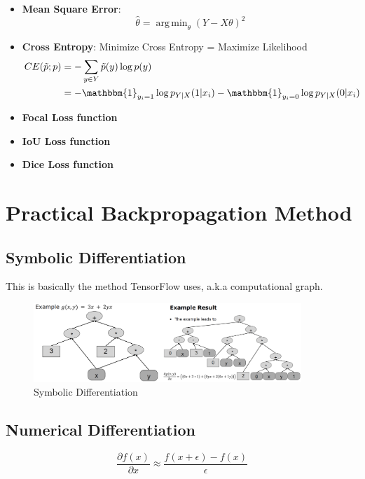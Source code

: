 \documentclass[a4paper]{article}
\DeclareMathOperator*{\argmin}{arg\,min}
\begin{document}
\begin{itemize}
	\item \textbf{Mean Square Error}:
	\begin{equation}
		\hat{\theta} = \argmin_{\theta} ( Y - X \theta )^2
	\end{equation}
	\item \textbf{Cross Entropy}: Minimize Cross Entropy = Maximize Likelihood
	\begin{align}
		CE(\tilde{p}; p) &= - \sum_{y \in Y} \tilde{p} (y) \log p(y) \\
		&= - \mathbbm{1}_{y_i = 1} \log p_{Y|X} (1 | x_i) - \mathbbm{1}_{y_i = 0} \log p_{Y|X} (0 | x_i)
	\end{align}
	\item \textbf{Focal Loss function}
	\item \textbf{IoU Loss function}
	\item \textbf{Dice Loss function}
\end{itemize}

\section{Practical Backpropagation Method}

\subsection{Symbolic Differentiation}

This is basically the method TensorFlow uses, a.k.a computational graph.
\begin{figure}[h]
	\centering
	\includegraphics[width=0.9\textwidth]{images/symbolicbp.png}
	\caption{Symbolic Differentiation}
	\label{fig:symbolicbp}
\end{figure}

\subsection{Numerical Differentiation}

\begin{equation}
	\frac{\partial f(x)}{\partial x} \approx \frac{f(x + \epsilon) - f(x)}{\epsilon}
\end{equation}
\end{document}
